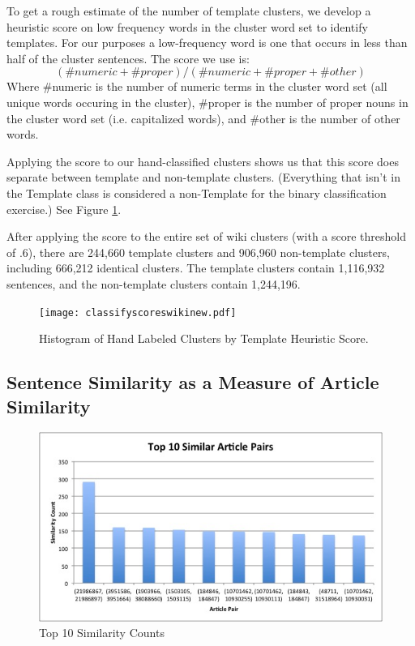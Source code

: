 \documentclass{acm_proc_article-sp}
\begin{document}
To get a rough estimate of the number of template clusters, we develop a heuristic score on low frequency words in the cluster word set to identify templates. For our purposes a low-frequency word is one that occurs in less than half of the cluster sentences. The score we use is:
\[(\#numeric + \#proper)/(\#numeric + \#proper + \#other)\]
Where \#numeric is the number of numeric terms in the cluster word set (all unique words occuring in the cluster), \#proper is the number of proper nouns in the cluster word set (i.e. capitalized words), and \#other is the number of other words.

Applying the score to our hand-classified clusters shows us that this score does separate between template and non-template clusters. (Everything that isn't in the Template class is considered a non-Template for the binary classification exercise.) See Figure \ref{heuristic}.

After applying the score to the entire set of wiki clusters (with a score threshold of .6), there are 244,660 template clusters and 906,960 non-template clusters, including 666,212 identical clusters. The template clusters contain 1,116,932 sentences, and the non-template clusters contain 1,244,196.

\begin{figure}
\centering
\texttt{[image: classifyscoreswikinew.pdf]}
\caption{Histogram of Hand Labeled Clusters by Template Heuristic Score.}
\label{heuristic}
\end{figure}


\subsection{Sentence Similarity as a Measure of Article Similarity}

\begin{figure}
\begin{center}
\includegraphics[scale=0.43, keepaspectratio = true]{Top10ArticlePairs.jpg}
\end{center}
\caption{Top 10 Similarity Counts}
\label{toparticles}
\end{figure}
\end{document}
